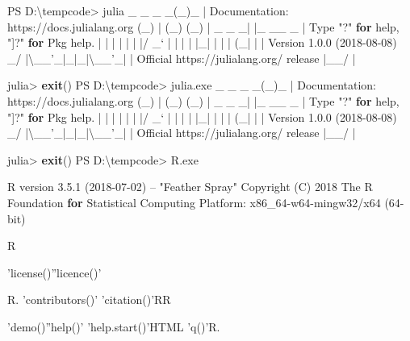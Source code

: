 \documentclass[11pt]{ctexart}
\newenvironment{Shaded}{}{}
\newcommand{\KeywordTok}[1]{\textcolor[rgb]{0.00,0.44,0.13}{\textbf{{#1}}}}
\newcommand{\StringTok}[1]{\textcolor[rgb]{0.25,0.44,0.63}{{#1}}}
\newcommand{\FunctionTok}[1]{\textcolor[rgb]{0.02,0.16,0.49}{{#1}}}
\newcommand{\NormalTok}[1]{{#1}}
\begin{document}
\begin{Shaded}
\begin{Highlighting}[]
\FunctionTok{PS}\NormalTok{ D:\textbackslash{}tempcode> julia}
\NormalTok{               _}
\NormalTok{   _       _ _(_)_     |  Documentation: https://docs.}\FunctionTok{julialang}\NormalTok{.}\FunctionTok{org}
\NormalTok{  (_)     | (_) (_)    |}
\NormalTok{   _ _   _| |_  __ _   |  }\FunctionTok{Type} \StringTok{"?"} \KeywordTok{for}\NormalTok{ help, }\StringTok{"]?"} \KeywordTok{for}\NormalTok{ Pkg help.}
\NormalTok{  | | | | | | |/ _` |  |}
\NormalTok{  | | |_| | | | (_| |  |  Version 1.}\FunctionTok{0}\NormalTok{.}\FunctionTok{0}\NormalTok{ (2018-08-08)}
\NormalTok{ _/ |\textbackslash{}__'_|_|_|\textbackslash{}__'_|  |  Official https://julialang.}\FunctionTok{org}\NormalTok{/ release}
\NormalTok{|__/                   |}

\NormalTok{julia> }\KeywordTok{exit}\NormalTok{()}
\FunctionTok{PS}\NormalTok{ D:\textbackslash{}tempcode> julia.}\FunctionTok{exe}
\NormalTok{               _}
\NormalTok{   _       _ _(_)_     |  Documentation: https://docs.}\FunctionTok{julialang}\NormalTok{.}\FunctionTok{org}
\NormalTok{  (_)     | (_) (_)    |}
\NormalTok{   _ _   _| |_  __ _   |  }\FunctionTok{Type} \StringTok{"?"} \KeywordTok{for}\NormalTok{ help, }\StringTok{"]?"} \KeywordTok{for}\NormalTok{ Pkg help.}
\NormalTok{  | | | | | | |/ _` |  |}
\NormalTok{  | | |_| | | | (_| |  |  Version 1.}\FunctionTok{0}\NormalTok{.}\FunctionTok{0}\NormalTok{ (2018-08-08)}
\NormalTok{ _/ |\textbackslash{}__'_|_|_|\textbackslash{}__'_|  |  Official https://julialang.}\FunctionTok{org}\NormalTok{/ release}
\NormalTok{|__/                   |}

\NormalTok{julia> }\KeywordTok{exit}\NormalTok{()}
\FunctionTok{PS}\NormalTok{ D:\textbackslash{}tempcode> }\FunctionTok{R}\NormalTok{.}\FunctionTok{exe}

\FunctionTok{R}\NormalTok{ version 3.}\FunctionTok{5}\NormalTok{.}\FunctionTok{1}\NormalTok{ (2018-07-02) -- }\StringTok{"Feather Spray"}
\NormalTok{Copyright (C) 2018 The }\FunctionTok{R}\NormalTok{ Foundation }\KeywordTok{for}\NormalTok{ Statistical Computing}
\NormalTok{Platform: x86_64-w64-mingw32/x64 (64-bit)}

\FunctionTok{R}

\NormalTok{'license()''licence()'}

\FunctionTok{R}\NormalTok{.}
\NormalTok{'contributors()'}
\NormalTok{'citation()'RR}

\NormalTok{'demo()''help()'}
\NormalTok{'help.}\FunctionTok{start}\NormalTok{()'HTML}
\NormalTok{'q()'R.}


\end{Highlighting}
\end{Shaded}
\end{document}
